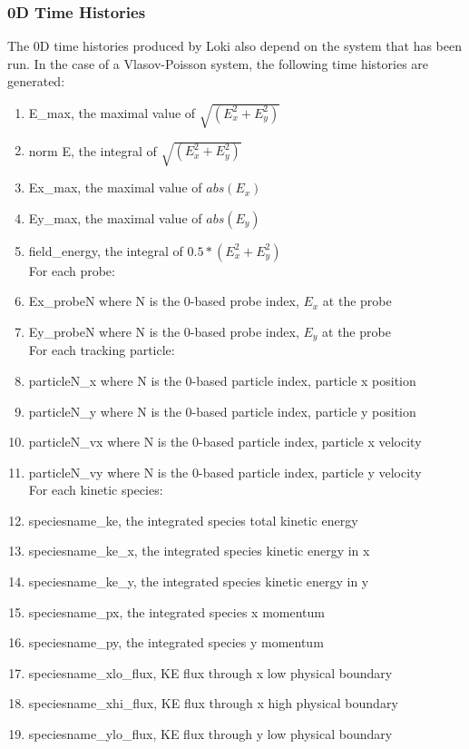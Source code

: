 \documentclass[11pt]{amsart}
\begin{document}
\subsubsection*{0D Time Histories}
The 0D time histories produced by Loki also depend on the system that has been
run.  In the case of a Vlasov-Poisson system, the following time histories are
generated:
\begin{enumerate}
\item E\_max, the maximal value of $\sqrt{(E_x^2 + E_y^2)}$
\item norm E, the integral of $\sqrt{(E_x^2 + E_y^2)}$
\item Ex\_max, the maximal value of $abs(E_x)$
\item Ey\_max, the maximal value of $abs(E_y)$
\item field\_energy, the integral of  $0.5*(E_x^2 + E_y^2)$ \\
For each probe:
\item Ex\_probeN where N is the 0-based probe index, $E_x$ at the probe
\item Ey\_probeN where N is the 0-based probe index, $E_y$ at the probe \\
For each tracking particle:
\item particleN\_x where N is the 0-based particle index, particle x position
\item particleN\_y where N is the 0-based particle index, particle y position
\item particleN\_vx where N is the 0-based particle index, particle x velocity
\item particleN\_vy where N is the 0-based particle index, particle y velocity \\
For each kinetic species:
\item speciesname\_ke, the integrated species total kinetic energy
\item speciesname\_ke\_x, the integrated species kinetic energy in x
\item speciesname\_ke\_y, the integrated species kinetic energy in y
\item speciesname\_px, the integrated species x momentum
\item speciesname\_py, the integrated species y momentum
\item speciesname\_xlo\_flux, KE flux through x low physical boundary
\item speciesname\_xhi\_flux, KE flux through x high physical boundary
\item speciesname\_ylo\_flux, KE flux through y low physical boundary

\end{enumerate}
\end{document}
